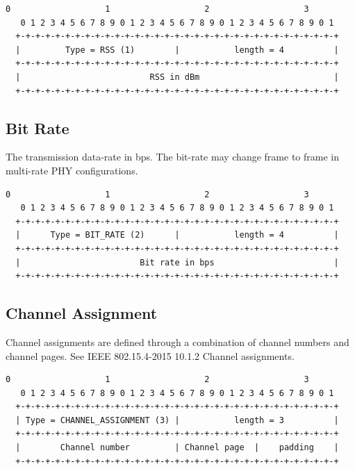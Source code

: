 \documentclass[12pt]{article}
\renewcommand\_{\textunderscore\allowbreak}
\begin{document}
\begin{Verbatim}[samepage=true]
   0                   1                   2                   3
   0 1 2 3 4 5 6 7 8 9 0 1 2 3 4 5 6 7 8 9 0 1 2 3 4 5 6 7 8 9 0 1
  +-+-+-+-+-+-+-+-+-+-+-+-+-+-+-+-+-+-+-+-+-+-+-+-+-+-+-+-+-+-+-+-+
  |         Type = RSS (1)        |           length = 4          |
  +-+-+-+-+-+-+-+-+-+-+-+-+-+-+-+-+-+-+-+-+-+-+-+-+-+-+-+-+-+-+-+-+
  |                          RSS in dBm                           |
  +-+-+-+-+-+-+-+-+-+-+-+-+-+-+-+-+-+-+-+-+-+-+-+-+-+-+-+-+-+-+-+-+
\end{Verbatim}

\newpage
\subsection{Bit Rate}

The transmission data-rate in bps.  The bit-rate may change frame to frame in
multi-rate PHY configurations.

\begin{Verbatim}[samepage=true]
   0                   1                   2                   3
   0 1 2 3 4 5 6 7 8 9 0 1 2 3 4 5 6 7 8 9 0 1 2 3 4 5 6 7 8 9 0 1
  +-+-+-+-+-+-+-+-+-+-+-+-+-+-+-+-+-+-+-+-+-+-+-+-+-+-+-+-+-+-+-+-+
  |      Type = BIT_RATE (2)      |           length = 4          |
  +-+-+-+-+-+-+-+-+-+-+-+-+-+-+-+-+-+-+-+-+-+-+-+-+-+-+-+-+-+-+-+-+
  |                        Bit rate in bps                        |
  +-+-+-+-+-+-+-+-+-+-+-+-+-+-+-+-+-+-+-+-+-+-+-+-+-+-+-+-+-+-+-+-+
\end{Verbatim}

\subsection{Channel Assignment}

Channel assignments are defined through a combination of channel numbers and
channel pages.  See IEEE 802.15.4-2015 10.1.2 Channel assignments.
\begin{Verbatim}[samepage=true]
   0                   1                   2                   3
   0 1 2 3 4 5 6 7 8 9 0 1 2 3 4 5 6 7 8 9 0 1 2 3 4 5 6 7 8 9 0 1
  +-+-+-+-+-+-+-+-+-+-+-+-+-+-+-+-+-+-+-+-+-+-+-+-+-+-+-+-+-+-+-+-+
  | Type = CHANNEL_ASSIGNMENT (3) |           length = 3          |
  +-+-+-+-+-+-+-+-+-+-+-+-+-+-+-+-+-+-+-+-+-+-+-+-+-+-+-+-+-+-+-+-+
  |        Channel number         | Channel page  |    padding    |
  +-+-+-+-+-+-+-+-+-+-+-+-+-+-+-+-+-+-+-+-+-+-+-+-+-+-+-+-+-+-+-+-+
\end{Verbatim}
\end{document}
